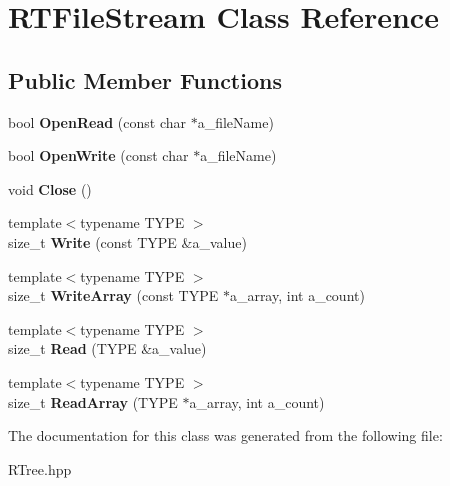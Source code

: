 \hypertarget{class_r_t_file_stream}{\section{\-R\-T\-File\-Stream \-Class \-Reference}
\label{class_r_t_file_stream}
}
\subsection*{\-Public \-Member \-Functions}
\begin{DoxyCompactItemize}
\item 
\hypertarget{class_r_t_file_stream_ac6173a0c9e27f20e6be7967973a4c88a}{bool {\bfseries \-Open\-Read} (const char $\ast$a\-\_\-file\-Name)}\label{class_r_t_file_stream_ac6173a0c9e27f20e6be7967973a4c88a}

\item 
\hypertarget{class_r_t_file_stream_a96b4770d34e8c5188d928ca5e53adb8b}{bool {\bfseries \-Open\-Write} (const char $\ast$a\-\_\-file\-Name)}\label{class_r_t_file_stream_a96b4770d34e8c5188d928ca5e53adb8b}

\item 
\hypertarget{class_r_t_file_stream_acaae552bed709bfeb980b392ce5d7752}{void {\bfseries \-Close} ()}\label{class_r_t_file_stream_acaae552bed709bfeb980b392ce5d7752}

\item 
\hypertarget{class_r_t_file_stream_a5f58ae8de73d979a992e4d7cfcbd462c}{{\footnotesize template$<$typename T\-Y\-P\-E $>$ }\\size\-\_\-t {\bfseries \-Write} (const \-T\-Y\-P\-E \&a\-\_\-value)}\label{class_r_t_file_stream_a5f58ae8de73d979a992e4d7cfcbd462c}

\item 
\hypertarget{class_r_t_file_stream_a7f13b1aa9c3fd6c116c9d482bfc4ae0d}{{\footnotesize template$<$typename T\-Y\-P\-E $>$ }\\size\-\_\-t {\bfseries \-Write\-Array} (const \-T\-Y\-P\-E $\ast$a\-\_\-array, int a\-\_\-count)}\label{class_r_t_file_stream_a7f13b1aa9c3fd6c116c9d482bfc4ae0d}

\item 
\hypertarget{class_r_t_file_stream_a389780f31ac4853b850fce1ce6ee9df9}{{\footnotesize template$<$typename T\-Y\-P\-E $>$ }\\size\-\_\-t {\bfseries \-Read} (\-T\-Y\-P\-E \&a\-\_\-value)}\label{class_r_t_file_stream_a389780f31ac4853b850fce1ce6ee9df9}

\item 
\hypertarget{class_r_t_file_stream_afb034999c38e44e2a80637bfc3b907e5}{{\footnotesize template$<$typename T\-Y\-P\-E $>$ }\\size\-\_\-t {\bfseries \-Read\-Array} (\-T\-Y\-P\-E $\ast$a\-\_\-array, int a\-\_\-count)}\label{class_r_t_file_stream_afb034999c38e44e2a80637bfc3b907e5}

\end{DoxyCompactItemize}


\-The documentation for this class was generated from the following file\-:\begin{DoxyCompactItemize}
\item 
\-R\-Tree.\-hpp\end{DoxyCompactItemize}
